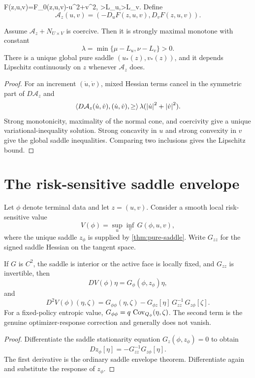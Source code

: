  F(z,u,v)=F_0(z,u,v)-\frac{}\abs u^2+\frac{}\abs v^2,
 \qquad \mu>L_u,\quad\nu>L_v.
\]
Define
\[
 \mathcal A_z(u,v)=(-D_uF(z,u,v),D_vF(z,u,v)).
\]

\begin{theorem}\label{thm:pure-saddle}
Assume $\mathcal A_z+N_{U\times V}$ is coercive.  Then it is strongly maximal
monotone with constant
\[
 \lambda=\min\{\mu-L_u,\nu-L_v\}>0.
\]
There is a unique global pure saddle $(u_*(z),v_*(z))$, and it depends
Lipschitz continuously on $z$ whenever $\mathcal A_z$ does.
\end{theorem}
\begin{proof}
For an increment $(\dot u,\dot v)$, mixed Hessian terms cancel in the symmetric
part of $D\mathcal A_z$ and
\[
 \left\langle D\mathcal A_z(\dot u,\dot v),(\dot u,\dot v),\ge\right\rangle\lambda(\left\lvert \dot u\right\rvert^2+\left\lvert \dot v\right\rvert^2).
\]
Strong monotonicity, maximality of the normal cone, and coercivity give a
unique variational-inequality solution.  Strong concavity in $u$ and strong
convexity in $v$ give the global saddle inequalities.  Comparing two
inclusions gives the Lipschitz bound.
\end{proof}

\section{The risk-sensitive saddle envelope}\label{sec:envelope}
Let $\phi$ denote terminal data and let $z=(u,v)$.  Consider a smooth local
risk-sensitive value
\[
 V(\phi)=\sup_u\inf_v\,G(\phi,u,v),
\]
where the unique saddle $z_\phi$ is supplied by \cref{thm:pure-saddle}.  Write
$G_{zz}$ for the signed saddle Hessian on the tangent space.

\begin{theorem}\label{thm:envelope}
If $G$ is $C^2$, the saddle is interior or the active face is locally fixed,
and $G_{zz}$ is invertible, then
\[
 DV(\phi)\eta=G_\phi(\phi,z_\phi)\eta,
\]
and
\[
 D^2V(\phi)(\eta,\zeta)
 =G_{\phi\phi}(\eta,\zeta)
 -G_{\phi z}[\eta]\,G_{zz}^{-1}\,G_{z\phi}[\zeta].
\]
For a fixed-policy entropic value,
$G_{\phi\phi}=q\,\operatorname{Cov}_{Q_\phi}(\eta,\zeta)$.  The second term is the genuine
optimizer-response correction and generally does not vanish.
\end{theorem}
\begin{proof}
Differentiate the saddle stationarity equation
$G_z(\phi,z_\phi)=0$ to obtain
\[
 Dz_\phi[\eta]=-G_{zz}^{-1}G_{z\phi}[\eta].
\]
The first derivative is the ordinary saddle envelope theorem.  Differentiate
again and substitute the response of $z_\phi$.
\end{proof}

